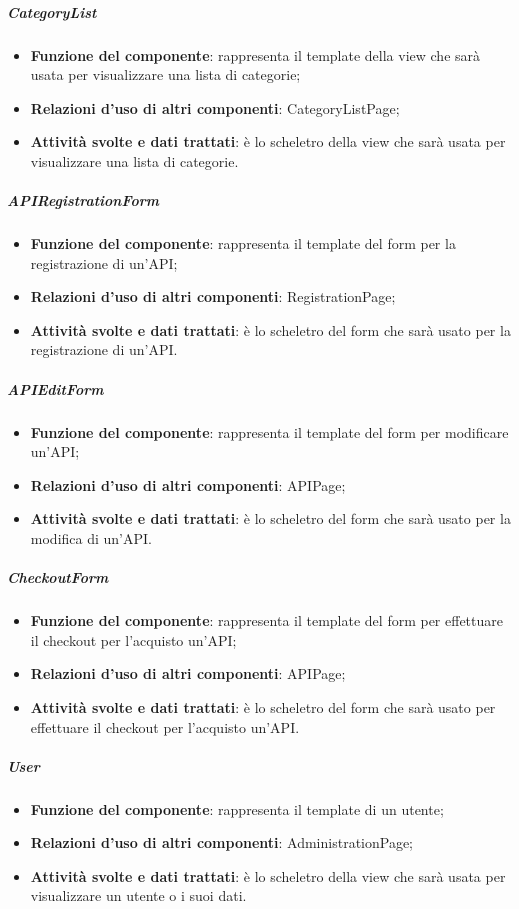 \subparagraph{CategoryList}
\begin{itemize}
	\item \textbf{Funzione del componente}: rappresenta il template della view che sar\`{a} usata per visualizzare una lista di categorie;
	\item \textbf{Relazioni d’uso di altri componenti}: CategoryListPage;
	\item \textbf{Attività svolte e dati trattati}: \`{e} lo scheletro della view che sar\`{a} usata per visualizzare una lista di categorie.
\end{itemize}

\subparagraph{APIRegistrationForm}
\begin{itemize}
	\item \textbf{Funzione del componente}: rappresenta il template del form per la registrazione di un'API;
	\item \textbf{Relazioni d’uso di altri componenti}: RegistrationPage;
	\item \textbf{Attività svolte e dati trattati}: \`{e} lo scheletro del form che sar\`{a} usato per la registrazione di un'API.
\end{itemize}

\subparagraph{APIEditForm}
\begin{itemize}
	\item \textbf{Funzione del componente}: rappresenta il template del form per modificare un'API;
	\item \textbf{Relazioni d’uso di altri componenti}: APIPage;
	\item \textbf{Attività svolte e dati trattati}: \`{e} lo scheletro del form che sar\`{a} usato per la modifica di un'API.
\end{itemize}

\subparagraph{CheckoutForm}
\begin{itemize}
	\item \textbf{Funzione del componente}: rappresenta il template del form per effettuare il checkout per l'acquisto un'API;
	\item \textbf{Relazioni d’uso di altri componenti}: APIPage;
	\item \textbf{Attività svolte e dati trattati}: \`{e} lo scheletro del form che sar\`{a} usato per effettuare il checkout per l'acquisto un'API.
\end{itemize}

\subparagraph{User}
\begin{itemize}
	\item \textbf{Funzione del componente}: rappresenta il template di un utente;
	\item \textbf{Relazioni d’uso di altri componenti}: AdministrationPage;
	\item \textbf{Attività svolte e dati trattati}: \`{e} lo scheletro della view che sar\`{a} usata per visualizzare un utente o i suoi dati.
\end{itemize}

